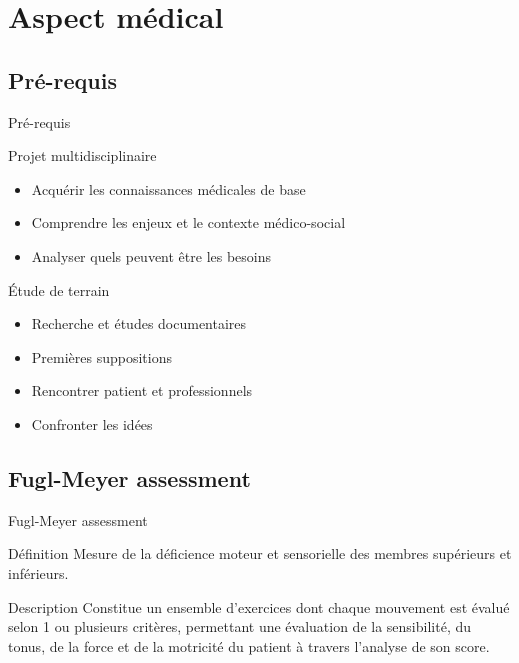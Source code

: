 \section{Aspect médical}

\begin{frame}
\end{frame}


\subsection{Pré-requis}
\begin{frame}{Pré-requis}
	\begin{block}{Projet multidisciplinaire}
		\begin{itemize}
			\item Acquérir les connaissances médicales de base  \pause
			\item Comprendre les enjeux et le contexte médico-social  \pause
			\item Analyser quels peuvent être les besoins
		\end{itemize}			
	\end{block}  \pause
		\begin{block}{Étude de terrain}
		\begin{itemize}
			\item Recherche et études documentaires  \pause
			\item Premières suppositions   \pause
			\item Rencontrer patient et professionnels  \pause
			\item Confronter les idées
		\end{itemize}			
	\end{block}
\end{frame}

\subsection{Fugl-Meyer assessment}
\begin{frame}{Fugl-Meyer assessment}
	\begin{block}{Définition}
Mesure de la déficience moteur et sensorielle des membres supérieurs et inférieurs.
	\end{block}  \pause
	\begin{block}{Description}
Constitue un ensemble d'exercices dont chaque mouvement est évalué selon 1 ou plusieurs critères, permettant une évaluation de la sensibilité, du tonus, de la force et de la motricité du patient à travers l'analyse de son score.
	\end{block}
\end{frame}

